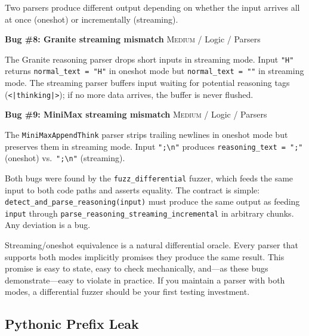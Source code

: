 Two parsers produce different output depending on whether the input arrives all at once (oneshot) or incrementally (streaming).

\begin{bugbox}
\textbf{Bug \#8: Granite streaming mismatch} \hfill \textsc{Medium} / Logic / Parsers

The Granite reasoning parser drops short inputs in streaming mode. Input \texttt{"H"} returns \texttt{normal\_text = "H"} in oneshot mode but \texttt{normal\_text = ""} in streaming mode. The streaming parser buffers input waiting for potential reasoning tags (\texttt{<|thinking|>}); if no more data arrives, the buffer is never flushed.
\end{bugbox}

\begin{bugbox}
\textbf{Bug \#9: MiniMax streaming mismatch} \hfill \textsc{Medium} / Logic / Parsers

The \texttt{MiniMaxAppendThink} parser strips trailing newlines in oneshot mode but preserves them in streaming mode. Input \texttt{";{\textbackslash}n"} produces \texttt{reasoning\_text = ";"} (oneshot) vs.\ \texttt{";\textbackslash n"} (streaming).
\end{bugbox}

Both bugs were found by the \texttt{fuzz\_differential} fuzzer, which feeds the same input to both code paths and asserts equality. The contract is simple: \texttt{detect\_and\_parse\_reasoning(input)} must produce the same output as feeding \texttt{input} through \texttt{parse\_reasoning\_streaming\_incremental} in arbitrary chunks. Any deviation is a bug.

\begin{insightbox}
Streaming/oneshot equivalence is a natural differential oracle. Every parser that supports both modes implicitly promises they produce the same result. This promise is easy to state, easy to check mechanically, and---as these bugs demonstrate---easy to violate in practice. If you maintain a parser with both modes, a differential fuzzer should be your first testing investment.
\end{insightbox}

\subsection{Pythonic Prefix Leak}


